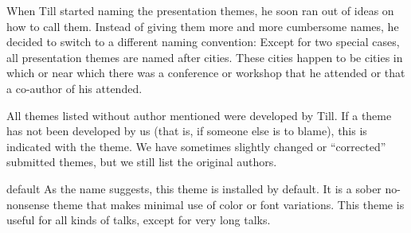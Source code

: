 When Till started naming the presentation themes, he soon ran out of ideas on how to call them. Instead of giving them more and more cumbersome names, he decided to switch to a different naming convention: Except for two special cases, all presentation themes are named after cities. These cities happen to be cities in which or near which there was a conference or workshop that he attended or that a co-author of his attended.

All themes listed without author mentioned were developed by Till. If a theme has not been developed by us (that is, if someone else is to blame), this is indicated with the theme. We have sometimes slightly changed or ``corrected'' submitted themes, but we still list the original authors.

\begin{themeexample}{default}
  As the name suggests, this theme is installed by default. It is a sober no-nonsense theme that makes minimal use of color or font variations. This theme is useful for all kinds of talks, except for very long talks.
\end{themeexample}

